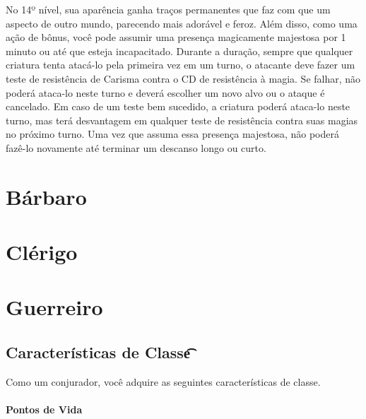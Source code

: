 \documentclass{RPG_Adventure}[2021/10/20]
\begin{document}
No 14º nível, sua aparência ganha traços permanentes que faz com que um aspecto
de outro mundo, parecendo mais adorável e feroz.
Além disso, como uma ação de bônus, você pode assumir uma presença magicamente
majestosa por 1 minuto ou até que esteja incapacitado. Durante a duração, sempre
que qualquer criatura tenta atacá-lo pela primeira vez em um turno, o atacante
deve fazer um teste de resistência de Carisma contra o CD de resistência à
magia. Se falhar, não poderá ataca-lo neste turno e deverá escolher um novo alvo
ou o ataque é cancelado. Em caso de um teste bem sucedido, a criatura poderá
ataca-lo neste turno, mas terá desvantagem em qualquer teste de resistência
contra suas magias no próximo turno.
Uma vez que assuma essa presença majestosa, não poderá fazê-lo novamente até
terminar um descanso longo ou curto.


\chapter{Bárbaro}%
\label{cha:barbaro}


\chapter{Clérigo}%
\label{cha:clerigo}


\chapter{Guerreiro}%
\label{cha:guerreiro}

\section*{Características de Classe\t\t}%
\label{sec:caracteristicas_de_classe}

Como um conjurador, você adquire as seguintes características de classe.

\subsubsection{Pontos de Vida}%
\label{ssub:pontos_de_vida}
\end{document}
